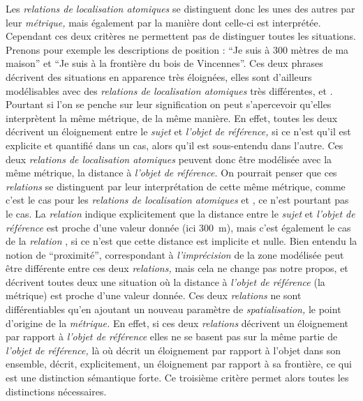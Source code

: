 Les \emph{relations de localisation atomiques} se distinguent donc les unes des autres par leur \emph{métrique,} mais également par la manière dont celle-ci est interprétée. Cependant ces deux critères ne permettent pas de distinguer toutes les situations. Prenons pour exemple les descriptions de position : \enquote{Je suis à 300 mètres de ma maison} et \enquote{Je suis à la frontière du bois de Vincennes}. Ces deux phrases décrivent des situations en apparence très éloignées, elles sont d'ailleurs modélisables avec des \emph{relations de localisation atomiques} très différentes,  et . Pourtant si l'on se penche sur leur signification on peut s’apercevoir qu'elles interprètent la même métrique, de la même manière. En effet, toutes les deux décrivent un éloignement entre le \emph{sujet} et \emph{l'objet de référence,} si ce n'est qu'il est explicite et quantifié dans un cas, alors qu'il est sous-entendu dans l'autre. Ces deux \emph{relations de localisation atomiques} peuvent donc être modélisée avec la même métrique, la distance à \emph{l'objet de référence.} On pourrait penser que ces \emph{relations} se distinguent par leur interprétation de cette même métrique, comme c'est le cas pour les \emph{relations de localisation atomiques}  et , ce n'est pourtant pas le cas. La \emph{relation}  indique explicitement que la distance entre le \emph{sujet} et \emph{l'objet de référence} est proche d'une valeur donnée (ici \SI{300}{\meter}), mais c'est également le cas de la \emph{relation} , si ce n'est que cette distance est implicite et nulle. Bien entendu la notion de \enquote{proximité}, correspondant à \emph{l'imprécision} de la zone modélisée peut être différente entre ces deux \emph{relations,} mais cela ne change pas notre propos,  et  décrivent toutes deux une situation où la distance à \emph{l'objet de référence} (\ie la métrique) est proche d'une valeur donnée. Ces deux \emph{relations} ne sont différentiables qu'en ajoutant un nouveau paramètre de \emph{spatialisation,} le point d'origine de la \emph{métrique.} En effet, si ces deux \emph{relations} décrivent un éloignement par rapport à \emph{l'objet de référence} elles ne se basent pas sur la même partie de \emph{l'objet de référence,} là où  décrit un éloignement par rapport à l'objet dans son ensemble,  décrit, explicitement, un éloignement par rapport à sa frontière, ce qui est une distinction sémantique forte. Ce troisième critère permet alors toutes les distinctions nécessaires.

